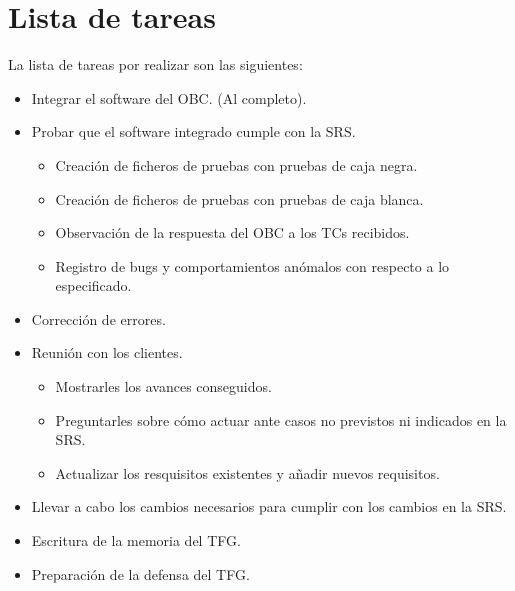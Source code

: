 \section{Lista de tareas}
La lista de tareas por realizar son las siguientes:
\begin{itemize}


\item Integrar el software del OBC. (Al completo).

\item Probar que el software integrado cumple con la SRS.
  \begin{itemize}
    \itemsep0em
  \item Creación de ficheros de pruebas con pruebas de caja negra.
  \item Creación de ficheros de pruebas con pruebas de caja blanca.
  \item Observación de la respuesta del OBC a los TCs recibidos.
  \item Registro de bugs y comportamientos anómalos con respecto a lo
    especificado.
  \end{itemize}

\item Corrección de errores.  
  
\item Reunión con los clientes.
  \begin{itemize}
    \itemsep0em
  \item Mostrarles los avances conseguidos.
  \item Preguntarles sobre cómo actuar ante casos no previstos ni indicados
    en la SRS.
  \item Actualizar los resquisitos existentes y añadir nuevos requisitos.
  \end{itemize}

\item Llevar a cabo los cambios necesarios para cumplir con los cambios en la
  SRS.

\item Escritura de la memoria del TFG.
\item Preparación de la defensa del TFG.
  
\end{itemize}

